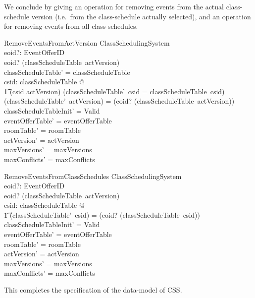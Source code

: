 \documentclass[a4paper]{article}
\begin{document}
\noindent
We conclude by giving an operation for removing events from the actual
class-schedule version (i.e.~from the class-schedule actually selected), and an
operation for removing events from all class-schedules.
\begin{schema}{RemoveEventsFromActVersion}
  \Delta ClassSchedulingSystem \\
  eoid?: \power EventOfferID \\
  \where
  eoid? \subseteq \dom (classScheduleTable~actVersion) \\
  \dom classScheduleTable' = \dom classScheduleTable \\
  \forall csid: \dom classScheduleTable @ \\
  \t1 (csid \neq actVersion) \implies (classScheduleTable'~csid =
  classScheduleTable~csid) \\
  (classScheduleTable'~actVersion) = (eoid? \ndres
  (classScheduleTable~actVersion)) \\
  classScheduleTableInit' = Valid \\
  eventOfferTable' = eventOfferTable \\
  roomTable' = roomTable \\
  actVersion' = actVersion \\
  maxVersions' = maxVersions \\
  maxConflicts' = maxConflicts \\
\end{schema}
\begin{schema}{RemoveEventsFromClassSchedules}
  \Delta ClassSchedulingSystem \\
  eoid?: \power EventOfferID \\
  \where
  eoid? \subseteq \dom (classScheduleTable~actVersion) \\
  \forall csid: \dom classScheduleTable @ \\
  \t1 (classScheduleTable'~csid) = (eoid? \ndres
  (classScheduleTable~csid)) \\ 
  classScheduleTableInit' = Valid \\
  eventOfferTable' = eventOfferTable \\
  roomTable' = roomTable \\
  actVersion' = actVersion \\
  maxVersions' = maxVersions \\
  maxConflicts' = maxConflicts
\end{schema}

This completes the specification of the data-model of CSS. 
\end{document}
